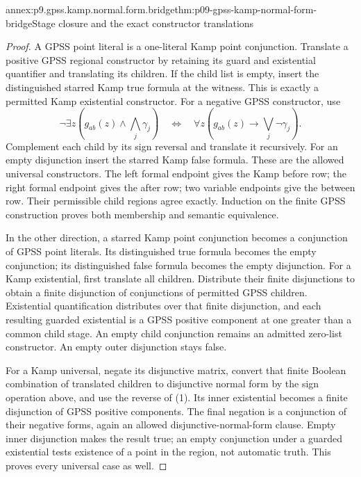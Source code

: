 \begin{annexitem}{annex:p9.gpss.kamp.normal.form.bridge}{thm:p09-gpss-kamp-normal-form-bridge}{Stage closure and the exact constructor translations}
\begin{proof}
A GPSS point literal is a one-literal Kamp point conjunction.
Translate a positive GPSS regional constructor by retaining its
guard and existential quantifier and translating its children.
If the child list is empty, insert the distinguished starred
Kamp true formula at the witness. This is exactly a permitted
Kamp existential constructor. For a negative GPSS constructor,
use
\[
 \neg\exists z\left(g_{ab}(z)\land\bigwedge_j\gamma_j\right)
 \quad\Longleftrightarrow\quad
 \forall z\left(g_{ab}(z)\to\bigvee_j\neg\gamma_j\right).
 \tag{1}
\]
Complement each child by its sign reversal and translate it
recursively. For an empty disjunction insert the starred Kamp
false formula. These are the allowed universal constructors.
The left formal endpoint gives the Kamp before row; the right
formal endpoint gives the after row; two variable endpoints give
the between row. Their permissible child regions agree exactly.
Induction on the finite GPSS construction proves both membership
and semantic equivalence.

In the other direction, a starred Kamp point conjunction becomes
a conjunction of GPSS point literals. Its distinguished true
formula becomes the empty conjunction; its distinguished false
formula becomes the empty disjunction. For a Kamp existential,
first translate all children. Distribute their finite disjunctions
to obtain a finite disjunction of conjunctions of permitted GPSS
children. Existential quantification distributes over that finite
disjunction, and each resulting guarded existential is a GPSS
positive component at one greater than a common child stage.
An empty child conjunction remains an admitted zero-list
constructor. An empty outer disjunction stays false.

For a Kamp universal, negate its disjunctive matrix, convert
that finite Boolean combination of translated children to
disjunctive normal form by the sign operation above, and use
the reverse of (1). Its inner existential becomes a finite
disjunction of GPSS positive components. The final negation
is a conjunction of their negative forms, again an allowed
disjunctive-normal-form clause. Empty inner disjunction makes
the result true; an empty conjunction under a guarded
existential tests existence of a point in the region, not
automatic truth. This proves every universal case as well.


\end{proof}
\end{annexitem}
